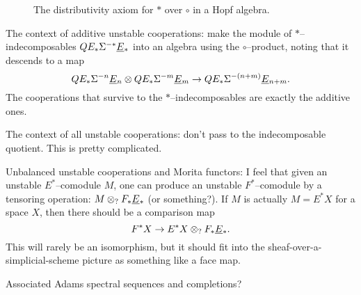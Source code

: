 \begin{figure}
\begin{center}
\end{center}
\caption{The distributivity axiom for $\ast$ over $\circ$ in a Hopf algebra.}\label{DistributivityDiagram}
\end{figure}

The context of additive unstable cooperations: make the module of $\ast$--indecomposables $QE_* \Sigma^{-*} \smash{\underline{E}}_{*}$ into an algebra using the $\circ$--product, noting that it descends to a map \[QE_* \Sigma^{-n} \smash{\underline{E}}_{n} \otimes QE_* \Sigma^{-m} \smash{\underline{E}}_{m} \to QE_* \Sigma^{-(n+m)} \smash{\underline{E}}_{n+m}.\]  The cooperations that survive to the $\ast$--indecomposables are exactly the additive ones.

The context of all unstable cooperations: don't pass to the indecomposable quotient.  This is pretty complicated.

Unbalanced unstable cooperations and Morita functors: I feel that given an unstable $E^*$--comodule $M$, one can produce an unstable $F^*$--comodule by a tensoring operation: $M \otimes_? F_* \smash{\underline{E}}_{*}$ (or something?).  If $M$ is actually $M = E^* X$ for a space $X$, then there should be a comparison map \[F^* X \to E^* X \otimes_? F_* \smash{\underline{E}}_{*}.\]  This will rarely be an isomorphism, but it should fit into the sheaf-over-a-simplicial-scheme picture as something like a face map.

Associated Adams spectral sequences and completions?

